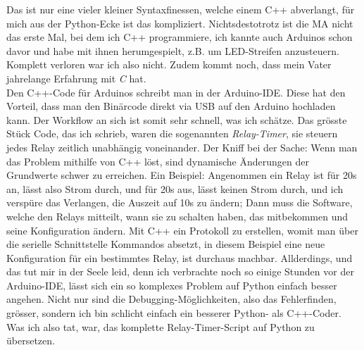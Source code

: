 \documentclass[12pt,titlepage,a4paper]{article}
\begin{document}
Das ist nur eine vieler kleiner Syntaxfinessen, welche einem C++ abverlangt, für mich aus der Python-Ecke ist das kompliziert. Nichtsdestotrotz ist die MA nicht das erste Mal, bei dem ich C++ programmiere, ich kannte auch Arduinos schon davor und habe mit ihnen herumgespielt, z.B. um LED-Streifen anzusteuern. Komplett verloren war ich also nicht. Zudem kommt noch, dass mein Vater jahrelange Erfahrung mit \textit{C} hat. \\Den C++-Code für Arduinos schreibt man in der Arduino-IDE. Diese hat den Vorteil, dass man den Binärcode direkt via USB auf den Arduino hochladen kann. Der Workflow an sich ist somit sehr schnell, was ich schätze. Das grösste Stück Code, das ich schrieb, waren die sogenannten \textit{Relay-Timer}, sie steuern jedes Relay zeitlich unabhängig voneinander. Der Kniff bei der Sache: Wenn man das Problem mithilfe von C++ löst, sind dynamische Änderungen der Grundwerte schwer zu erreichen. Ein Beispiel: Angenommen ein Relay ist für 20s an, lässt also Strom durch, und für 20s aus, lässt keinen Strom durch, und ich verspüre das Verlangen, die Auszeit auf 10s zu ändern; Dann muss die Software, welche den Relays mitteilt, wann sie zu schalten haben, das mitbekommen und seine Konfiguration ändern. Mit C++ ein Protokoll zu erstellen, womit man über die serielle Schnittstelle Kommandos absetzt, in diesem Beispiel eine neue Konfiguration für ein bestimmtes Relay, ist durchaus machbar. Allderdings, und das tut mir in der Seele leid, denn ich verbrachte noch so einige Stunden vor der Arduino-IDE, lässt sich ein so komplexes Problem auf Python einfach besser angehen. Nicht nur sind die Debugging-Möglichkeiten, also das Fehlerfinden, grösser, sondern ich bin schlicht einfach ein besserer Python- als C++-Coder. Was ich also tat, war, das komplette Relay-Timer-Script auf Python zu übersetzen.\\
\end{document}
